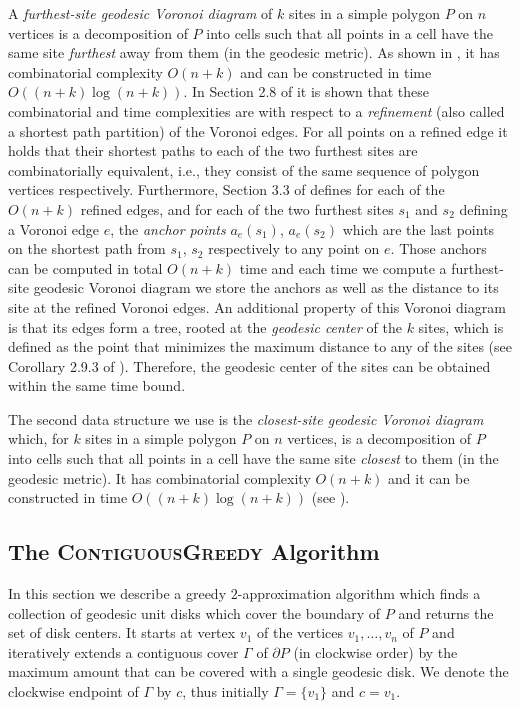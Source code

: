 \documentclass{llncs}
\begin{document}
{A \emph{furthest-site geodesic Voronoi diagram} of $k$ sites in a simple polygon $P$ on $n$ vertices is a decomposition of $P$ into cells such that all points in a cell have the same site \emph{furthest} away from them {(in the geodesic metric)}. As shown in \cite{BorisFurthest}, it has combinatorial complexity $O(n+k)$ and can be constructed in time $O((n+k)\log(n+k))$. In Section 2.8 of \cite{BorisFurthest} it is shown that these combinatorial and time complexities are with respect to a \emph{refinement} (also called a shortest path partition) of the Voronoi edges. For all points on a refined edge it holds that their shortest paths to each of the two furthest sites are combinatorially equivalent, i.e., they consist of the same sequence of polygon vertices respectively. Furthermore, Section 3.3 of \cite{BorisFurthest} defines for each of the $O(n+k)$ refined edges, and for each of the two furthest sites $s_1$ and $s_2$ defining a Voronoi edge $e$, the \emph{anchor points} $a_e(s_1)$, $a_e(s_2)$ which are the last points on the shortest path from $s_1$, $s_2$ respectively to any point on $e$. Those anchors can be computed in total $O(n+k)$ time and each time we compute a   furthest-site geodesic Voronoi diagram we store the anchors as well as the distance to its site at the refined Voronoi edges. An additional property of this Voronoi diagram is that its edges form a tree, rooted at the \emph{geodesic center} of the $k$ sites, which is defined as the point that minimizes the maximum distance to any of the sites (see Corollary 2.9.3 of \cite{BorisFurthest}). Therefore, the geodesic center of the sites can be obtained within the same time bound.

The second data structure we use is the \emph{closest-site geodesic Voronoi diagram}  { which, for $k$ sites in a simple polygon $P$ on $n$ vertices,}
is a decomposition of $P$ into cells such that all points in a cell have the same site \emph{closest} to them {(in the geodesic metric)}. It has combinatorial complexity $O(n+k)$ and it can be constructed in time $O((n+k)\log(n+k))$ (see \cite{borisClose}). 

\subsection{The \textsc{ContiguousGreedy} Algorithm}
In this section we describe a greedy $2$-approximation algorithm which finds a collection of geodesic unit disks which cover the boundary of $P$ and returns the set of disk centers. It starts at vertex $v_1$ of  the vertices $v_1, \ldots, v_n$ of $P$ and {iteratively extends a contiguous cover $\Gamma$ of $\partial P$  (in clockwise order) by the maximum amount that can be covered with a single geodesic disk.} We denote the clockwise endpoint of $\Gamma$ by $c$, thus initially $\Gamma = \{v_1\}$ and $c = v_1$. \\


}
\end{document}
